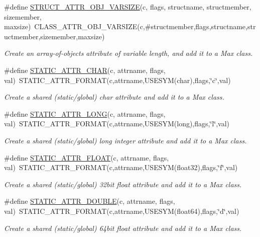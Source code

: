 \begin{DoxyCompactItemize}
\#define \hyperlink{group__attr_gab7a7a2956ee6a7fddfc5ee6dae1609b0}{STRUCT\_\-ATTR\_\-OBJ\_\-VARSIZE}(c, flags, structname, structmember, sizemember, maxsize)~CLASS\_\-ATTR\_\-OBJ\_\-VARSIZE(c,\#structmember,flags,structname,structmember,sizemember,maxsize)
\begin{DoxyCompactList}\small\item\em Create an array-\/of-\/objects attribute of variable length, and add it to a Max class. \item\end{DoxyCompactList}\item 
\#define \hyperlink{group__attr_ga3d4b3c34060baa3e96904a08d2b92c82}{STATIC\_\-ATTR\_\-CHAR}(c, attrname, flags, val)~STATIC\_\-ATTR\_\-FORMAT(c,attrname,USESYM(char),flags,\char`\"{}c\char`\"{},val)
\begin{DoxyCompactList}\small\item\em Create a shared (static/global) char attribute and add it to a Max class. \item\end{DoxyCompactList}\item 
\#define \hyperlink{group__attr_gaddc7ea0e35bc72027f13798912c80286}{STATIC\_\-ATTR\_\-LONG}(c, attrname, flags, val)~STATIC\_\-ATTR\_\-FORMAT(c,attrname,USESYM(long),flags,\char`\"{}l\char`\"{},val)
\begin{DoxyCompactList}\small\item\em Create a shared (static/global) long integer attribute and add it to a Max class. \item\end{DoxyCompactList}\item 
\#define \hyperlink{group__attr_ga166e7a3a2d7b3f0932c2dd9063673fc6}{STATIC\_\-ATTR\_\-FLOAT}(c, attrname, flags, val)~STATIC\_\-ATTR\_\-FORMAT(c,attrname,USESYM(float32),flags,\char`\"{}f\char`\"{},val)
\begin{DoxyCompactList}\small\item\em Create a shared (static/global) 32bit float attribute and add it to a Max class. \item\end{DoxyCompactList}\item 
\#define \hyperlink{group__attr_ga10c4eeafd211a5228352eaa12af6d2ce}{STATIC\_\-ATTR\_\-DOUBLE}(c, attrname, flags, val)~STATIC\_\-ATTR\_\-FORMAT(c,attrname,USESYM(float64),flags,\char`\"{}d\char`\"{},val)
\begin{DoxyCompactList}\small\item\em Create a shared (static/global) 64bit float attribute and add it to a Max class. \item\end{DoxyCompactList}\item 

\end{DoxyCompactItemize}
